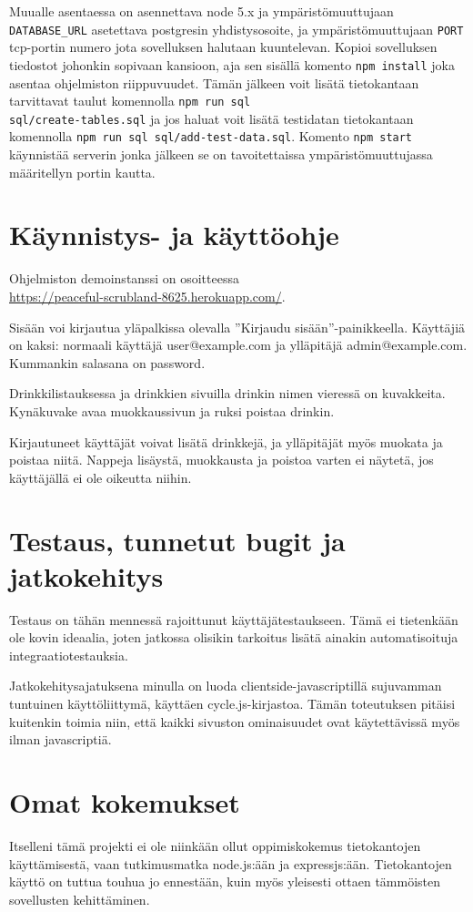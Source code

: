 \documentclass[a4paper]{article}
\begin{document}
Muualle asentaessa on asennettava node 5.x ja ympäristömuuttujaan \texttt{DATABASE\_URL} asetettava postgresin yhdistysosoite, ja ympäristömuuttujaan \texttt{PORT} tcp-portin numero jota sovelluksen halutaan kuuntelevan. Kopioi sovelluksen tiedostot johonkin sopivaan kansioon, aja sen sisällä komento \texttt{npm install} joka asentaa ohjelmiston riippuvuudet. Tämän jälkeen voit lisätä tietokantaan tarvittavat taulut komennolla \texttt{npm run sql \\ sql/create-tables.sql} ja jos haluat voit lisätä testidatan tietokantaan komennolla \texttt{npm run sql sql/add-test-data.sql}. Komento \texttt{npm start} käynnistää serverin jonka jälkeen se on tavoitettaissa ympäristömuuttujassa määritellyn portin kautta.

\section{Käynnistys- ja käyttöohje}
Ohjelmiston demoinstanssi on osoitteessa \\ \url{https://peaceful-scrubland-8625.herokuapp.com/}.

Sisään voi kirjautua yläpalkissa olevalla ''Kirjaudu sisään''-painikkeella. Käyttäjiä on kaksi: normaali käyttäjä user@example.com ja ylläpitäjä admin@example.com. Kummankin salasana on password.

Drinkkilistauksessa ja drinkkien sivuilla drinkin nimen vieressä on kuvakkeita. Kynäkuvake avaa muokkaussivun ja ruksi poistaa drinkin.

Kirjautuneet käyttäjät voivat lisätä drinkkejä, ja ylläpitäjät myös muokata ja poistaa niitä. Nappeja lisäystä, muokkausta ja poistoa varten ei näytetä, jos käyttäjällä ei ole oikeutta niihin.

\section{Testaus, tunnetut bugit ja jatkokehitys}
Testaus on tähän mennessä rajoittunut käyttäjätestaukseen. Tämä ei tietenkään ole kovin ideaalia, joten jatkossa olisikin tarkoitus lisätä ainakin automatisoituja integraatiotestauksia.

Jatkokehitysajatuksena minulla on luoda clientside-javascriptillä sujuvamman tuntuinen käyttöliittymä, käyttäen cycle.js-kirjastoa. Tämän toteutuksen pitäisi kuitenkin toimia niin, että kaikki sivuston ominaisuudet ovat käytettävissä myös ilman javascriptiä.

\section{Omat kokemukset}
Itselleni tämä projekti ei ole niinkään ollut oppimiskokemus tietokantojen käyttämisestä, vaan tutkimusmatka node.js:ään ja expressjs:ään. Tietokantojen käyttö on tuttua touhua jo ennestään, kuin myös yleisesti ottaen tämmöisten sovellusten kehittäminen.
\end{document}
